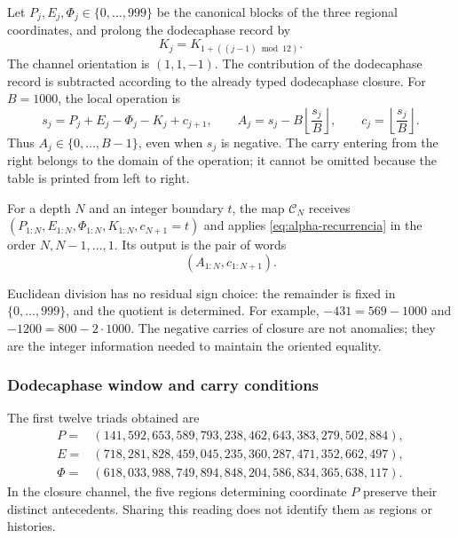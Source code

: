 Let \(P_j,E_j,\Phi_j\in\{0,\ldots,999\}\) be the canonical blocks of
the three regional coordinates, and prolong the dodecaphase record by
\[
 K_j=K_{1+((j-1)\bmod12)}.
\]
The channel orientation is \((1,1,-1)\). The contribution of the dodecaphase record is
subtracted according to the already typed dodecaphase closure. For \(B=1000\), the
local operation is
\begin{equation}
 s_j=P_j+E_j-\Phi_j-K_j+c_{j+1},\qquad
 A_j=s_j-B\left\lfloor\frac{s_j}{B}\right\rfloor,
 \qquad c_j=\left\lfloor\frac{s_j}{B}\right\rfloor.
 \label{eq:alpha-recurrencia}
\end{equation}
Thus \(A_j\in\{0,\ldots,B-1\}\), even when \(s_j\) is
negative. The carry entering from the right belongs to the domain of
the operation; it cannot be omitted because the table is printed from left
to right.

\begin{definition}
\label{def:alpha-finita}
For a depth \(N\) and an integer boundary \(t\), the map
\(\mathcal C_N\) receives
\((P_{1:N},E_{1:N},\Phi_{1:N},K_{1:N},c_{N+1}=t)\) and applies
\eqref{eq:alpha-recurrencia} in the order \(N,N-1,\ldots,1\). Its output
is the pair of words
\[
 (A_{1:N},c_{1:N+1}).
\]
\end{definition}

Euclidean division has no residual sign choice: the remainder is
fixed in \(\{0,\ldots,999\}\), and the quotient is determined. For
example, \(-431=569-1000\) and \(-1200=800-2\cdot1000\). The
negative carries of closure are not anomalies; they are the integer
information needed to maintain the oriented equality.

\subsubsection{Dodecaphase window and carry conditions}
\label{subsec:alpha-ventana}

The first twelve triads obtained are
\begin{align*}
 P={}&(141,592,653,589,793,238,462,643,383,279,502,884),\\
 E={}&(718,281,828,459,045,235,360,287,471,352,662,497),\\
 \Phi={}&(618,033,988,749,894,848,204,586,834,365,638,117).
\end{align*}
In the closure channel, the five regions determining coordinate
\(P\) preserve their distinct antecedents. Sharing this reading does not
identify them as regions or histories.

